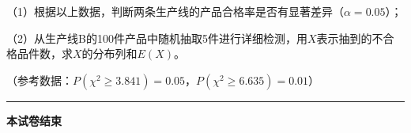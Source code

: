 \documentclass[12pt, a4paper]{ctexart}
\begin{document}
\begin{enumerate}[label=\textbf{\arabic*.}, leftmargin=2em, resume]
（1）根据以上数据，判断两条生产线的产品合格率是否有显著差异（$\alpha = 0.05$）；

（2）从生产线B的100件产品中随机抽取5件进行详细检测，用$X$表示抽到的不合格品件数，求$X$的分布列和$E(X)$。

（参考数据：$P(\chi^2 \geqslant 3.841) = 0.05$，$P(\chi^2 \geqslant 6.635) = 0.01$）

\end{enumerate}

\vspace{1cm}
\begin{center}
\rule{8cm}{0.4pt}

\vspace{0.3cm}
\textbf{本试卷结束}
\end{center}
\end{document}
